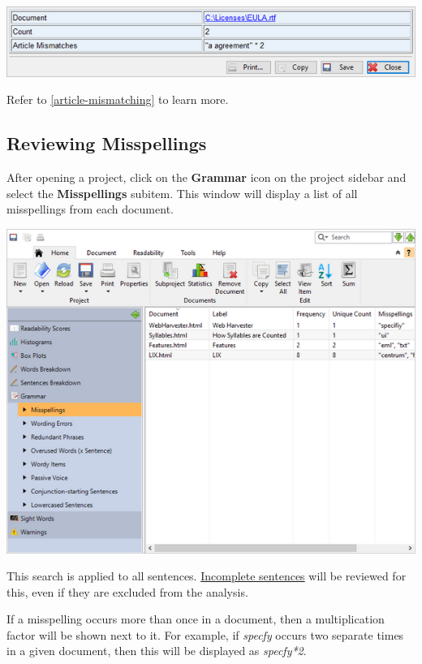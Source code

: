 \documentclass[
]{book}
\theoremstyle{definition}
\theoremstyle{definition}
\theoremstyle{definition}
\theoremstyle{definition}
\theoremstyle{remark}
\begin{document}
\includegraphics{Images/viewitemarticlemismatch.png}

Refer to \ref{article-mismatching} to learn more.

\hypertarget{reviewing-batch-misspellings}{%
\subsection*{Reviewing Misspellings}\label{reviewing-batch-misspellings}}

After opening a project, click on the \textbf{Grammar} icon on the project sidebar and select the \textbf{Misspellings} subitem. This window will display a list of all misspellings from each document.

\includegraphics{Images/batchmisspellings.png}

This search is applied to all sentences. \protect\hyperlink{how-text-is-excluded}{Incomplete sentences} will be reviewed for this, even if they are excluded from the analysis.

If a misspelling occurs more than once in a document, then a multiplication factor will be shown next to it. For example, if \emph{specfy} occurs two separate times in a given document, then this will be displayed as \emph{specfy*2}.
\end{document}

